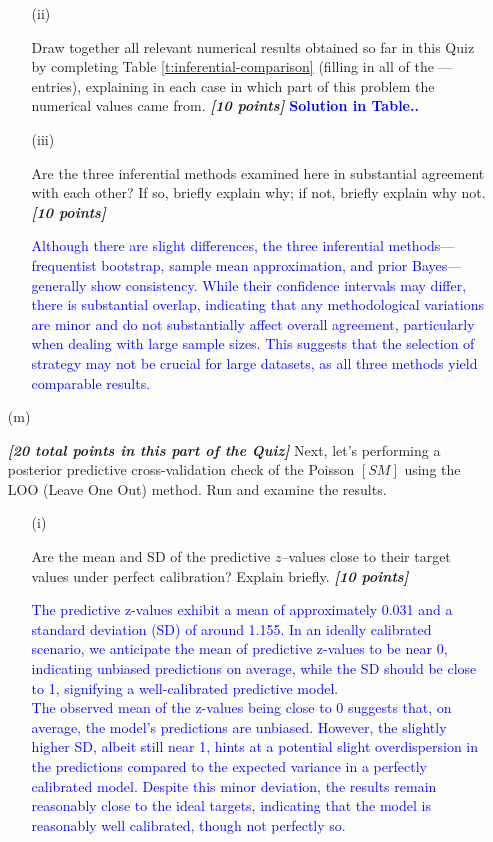 \documentclass[12pt]{article}
\newcommand{\bi}[1]{\b{\i{#1}}}
\renewcommand{\b}[1]{\textbf{#1}}
\renewcommand{\i}[1]{\textit{#1}}
\renewcommand{\t}[1]{\texttt{#1}}
\begin{document}
\begin{itemize}
\begin{itemize}
\item[(ii)]

Draw together all relevant numerical results obtained so far in this Quiz by completing Table \ref{t:inferential-comparison} (filling in all of the --- entries), explaining in each case in which part of this problem the numerical values came from. \bi{[10 points]}
\textcolor{blue}{\textbf{Solution in Table..}}

\item[(iii)]

Are the three inferential methods examined here in substantial agreement with each other? If so, briefly explain why; if not, briefly explain why not. \bi{[10 points]}

\textcolor{blue}{Although there are slight differences, the three inferential methods—frequentist bootstrap, sample mean approximation, and prior Bayes—generally show consistency. While their confidence intervals may differ, there is substantial overlap, indicating that any methodological variations are minor and do not substantially affect overall agreement, particularly when dealing with large sample sizes. This suggests that the selection of strategy may not be crucial for large datasets, as all three methods yield comparable results.}

\end{itemize}

\item[(m)]

\bi{[20 total points in this part of the Quiz]} Next, let's performing a posterior predictive cross-validation check of the Poisson $[ SM ]$ using the LOO (Leave One Out) method. Run \fbox{\t{Code Block 8}} and examine the results. 

\begin{itemize}

\item[(i)]

Are the mean and SD of the predictive $z$--values close to their target values under perfect calibration? Explain briefly. \bi{[10 points]}

\textcolor{blue}{The predictive z-values exhibit a mean of approximately 0.031 and a standard deviation (SD) of around 1.155. In an ideally calibrated scenario, we anticipate the mean of predictive z-values to be near 0, indicating unbiased predictions on average, while the SD should be close to 1, signifying a well-calibrated predictive model.
\\
The observed mean of the z-values being close to 0 suggests that, on average, the model's predictions are unbiased. However, the slightly higher SD, albeit still near 1, hints at a potential slight overdispersion in the predictions compared to the expected variance in a perfectly calibrated model. Despite this minor deviation, the results remain reasonably close to the ideal targets, indicating that the model is reasonably well calibrated, though not perfectly so.}


\end{itemize}
\end{itemize}
\end{document}
